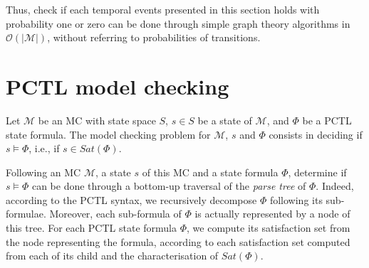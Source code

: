 Thus, check if each temporal events presented in this section holds with probability one or zero can be done through simple graph theory algorithms in $\mathcal{O}(|\mathcal{M}|)$, without referring to probabilities of transitions.

\section{PCTL model checking}
\begin{definition}
Let $\mathcal{M}$ be an MC with state space $S$, $s \in S$ be a state of $\mathcal{M}$, and $\Phi$ be a PCTL state formula. The model checking problem for $\mathcal{M}$, $s$ and $\Phi$ consists in deciding if $s \models \Phi$, i.e., if $s \in Sat(\Phi)$.
\end{definition}
Following an MC $\mathcal{M}$, a state $s$ of this MC and a state formula $\Phi$, determine if $s \models \Phi$ can be done through a bottom-up traversal of the \textit{parse tree} of $\Phi$.
Indeed, according to the PCTL syntax, we recursively decompose $\Phi$ following its sub-formulae. Moreover, each sub-formula of $\Phi$ is actually represented by a node of this tree. For each PCTL state formula $\Phi$, we compute its satisfaction set from the node representing the formula, according to each satisfaction set computed from each of its child and the characterisation of $Sat(\Phi)$.
